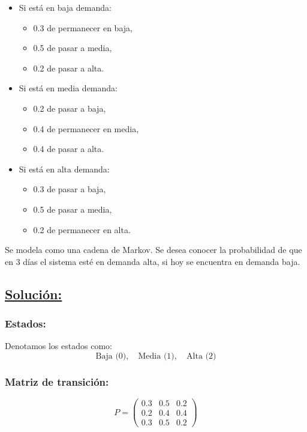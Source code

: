 \documentclass[a4paper,11pt]{article}
\begin{document}
\begin{itemize}
    \item Si está en baja demanda:
    \begin{itemize}
        \item 0.3 de permanecer en baja,
        \item 0.5 de pasar a media,
        \item 0.2 de pasar a alta.
    \end{itemize}
    \item Si está en media demanda:
    \begin{itemize}
        \item 0.2 de pasar a baja,
        \item 0.4 de permanecer en media,
        \item 0.4 de pasar a alta.
    \end{itemize}
    \item Si está en alta demanda:
    \begin{itemize}
        \item 0.3 de pasar a baja,
        \item 0.5 de pasar a media,
        \item 0.2 de permanecer en alta.
    \end{itemize}
\end{itemize}

Se modela como una cadena de Markov. Se desea conocer la probabilidad de que en 3 días el sistema esté en demanda alta, si hoy se encuentra en demanda baja.

\subsection*{\underline{Solución:}}

\vspace{0.5em}

\subsubsection{Estados:}

Denotamos los estados como:
\[
\text{Baja (0)}, \quad \text{Media (1)}, \quad \text{Alta (2)}
\]

\subsubsection{Matriz de transición:}

\[P = \begin{pmatrix}
0.3 & 0.5 & 0.2 \\
0.2 & 0.4 & 0.4 \\
0.3 & 0.5 & 0.2
\end{pmatrix}\]
\end{document}
